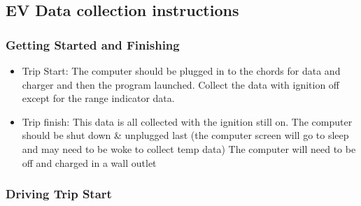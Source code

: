 \documentclass[]{article}
\title{}
\author{}
\date{}
\begin{document}
\hypertarget{ev-data-collection-instructions}{%
\subsection{EV Data collection
instructions}\label{ev-data-collection-instructions}}

\hypertarget{getting-started-and-finishing}{%
\subsubsection{Getting Started and
Finishing}\label{getting-started-and-finishing}}

\begin{itemize}
\item
  Trip Start: The computer should be plugged in to the chords for data
  and charger and then the program launched. Collect the data with
  ignition off except for the range indicator data.
\item
  Trip finish: This data is all collected with the ignition still on.
  The computer should be shut down \& unplugged last (the computer
  screen will go to sleep and may need to be woke to collect temp data)
  The computer will need to be off and charged in a wall outlet
\end{itemize}

\hypertarget{driving-trip-start}{%
\subsubsection{Driving Trip Start}\label{driving-trip-start}}
\end{document}

